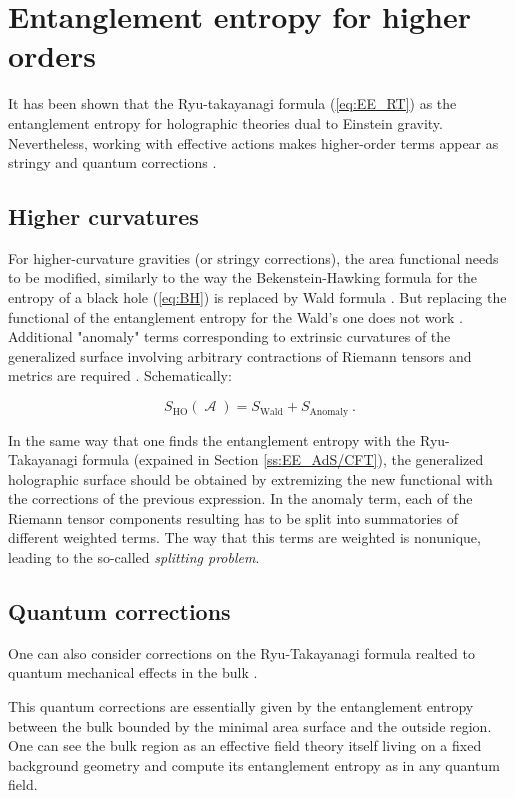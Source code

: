 \documentclass[twocolumn]{revtex4}
\providecommand{\eq}[2]{
    \begin{equation}
        #2
    \label{eq:#1}
    \end{equation}
}
\DeclareMathOperator{\calA}{\mathcal{A}}
\begin{document}
\section{Entanglement entropy for higher orders} \label{s:EE_HO}

It has been shown that the Ryu-takayanagi formula (\ref{eq:EE_RT}) as the entanglement entropy for holographic theories dual to Einstein gravity. Nevertheless, working with effective actions makes higher-order terms appear as stringy and quantum corrections \cite{bueno_holographic_2021}.


\subsection{Higher curvatures} \label{ss:StringyC}

For higher-curvature gravities (or stringy corrections), the area functional needs to be modified, similarly to the way the Bekenstein-Hawking formula for the entropy of a black hole (\ref{eq:BH}) is replaced by Wald formula \cite{iyer_properties_1994}. But replacing the functional of the entanglement entropy for the Wald's one does not work \cite{bueno_holographic_2021}. Additional "anomaly" terms corresponding to extrinsic curvatures of the generalized surface involving arbitrary contractions of Riemann tensors and metrics are required \cite{dong_holographic_2014}. Schematically:
\eq{EE_HO}{
    S_{\text{HO}}(\calA) = S_{\text{Wald}} + S_{\text{Anomaly}} \ .
}

In the same way that one finds the entanglement entropy with the Ryu-Takayanagi formula (expained in Section \ref{ss:EE_AdS/CFT}), the generalized holographic surface should be obtained by extremizing the new functional with the corrections of the previous expression. In the anomaly term, each of the Riemann tensor components resulting has to be split into summatories of different weighted terms. The way that this terms are weighted is nonunique, leading to the so-called \textit{splitting problem}.


\subsection{Quantum corrections} \label{ss:QuantumC}

One can also consider corrections on the Ryu-Takayanagi formula realted to quantum mechanical effects in the bulk \cite{faulkner_quantum_2013}.

This quantum corrections are essentially given by the entanglement entropy between the bulk bounded by the minimal area surface and the outside region. One can see the bulk region as an effective field theory itself living on a fixed background geometry and compute its entanglement entropy as in any quantum field.
\end{document}
